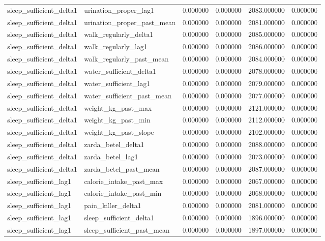 \begin{longtable}{llrrrr}
sleep\_sufficient\_delta1 & urination\_proper\_lag1 & 0.000000 & 0.000000 & 2083.000000 & 0.000000 \\
sleep\_sufficient\_delta1 & urination\_proper\_past\_mean & 0.000000 & 0.000000 & 2081.000000 & 0.000000 \\
sleep\_sufficient\_delta1 & walk\_regularly\_delta1 & 0.000000 & 0.000000 & 2085.000000 & 0.000000 \\
sleep\_sufficient\_delta1 & walk\_regularly\_lag1 & 0.000000 & 0.000000 & 2086.000000 & 0.000000 \\
sleep\_sufficient\_delta1 & walk\_regularly\_past\_mean & 0.000000 & 0.000000 & 2084.000000 & 0.000000 \\
sleep\_sufficient\_delta1 & water\_sufficient\_delta1 & 0.000000 & 0.000000 & 2078.000000 & 0.000000 \\
sleep\_sufficient\_delta1 & water\_sufficient\_lag1 & 0.000000 & 0.000000 & 2079.000000 & 0.000000 \\
sleep\_sufficient\_delta1 & water\_sufficient\_past\_mean & 0.000000 & 0.000000 & 2077.000000 & 0.000000 \\
sleep\_sufficient\_delta1 & weight\_kg\_past\_max & 0.000000 & 0.000000 & 2121.000000 & 0.000000 \\
sleep\_sufficient\_delta1 & weight\_kg\_past\_min & 0.000000 & 0.000000 & 2112.000000 & 0.000000 \\
sleep\_sufficient\_delta1 & weight\_kg\_past\_slope & 0.000000 & 0.000000 & 2102.000000 & 0.000000 \\
sleep\_sufficient\_delta1 & zarda\_betel\_delta1 & 0.000000 & 0.000000 & 2088.000000 & 0.000000 \\
sleep\_sufficient\_delta1 & zarda\_betel\_lag1 & 0.000000 & 0.000000 & 2073.000000 & 0.000000 \\
sleep\_sufficient\_delta1 & zarda\_betel\_past\_mean & 0.000000 & 0.000000 & 2087.000000 & 0.000000 \\
sleep\_sufficient\_lag1 & calorie\_intake\_past\_max & 0.000000 & 0.000000 & 2067.000000 & 0.000000 \\
sleep\_sufficient\_lag1 & calorie\_intake\_past\_min & 0.000000 & 0.000000 & 2068.000000 & 0.000000 \\
sleep\_sufficient\_lag1 & pain\_killer\_delta1 & 0.000000 & 0.000000 & 2081.000000 & 0.000000 \\
sleep\_sufficient\_lag1 & sleep\_sufficient\_delta1 & 0.000000 & 0.000000 & 1896.000000 & 0.000000 \\
sleep\_sufficient\_lag1 & sleep\_sufficient\_past\_mean & 0.000000 & 0.000000 & 1897.000000 & 0.000000 \\

\end{longtable}
